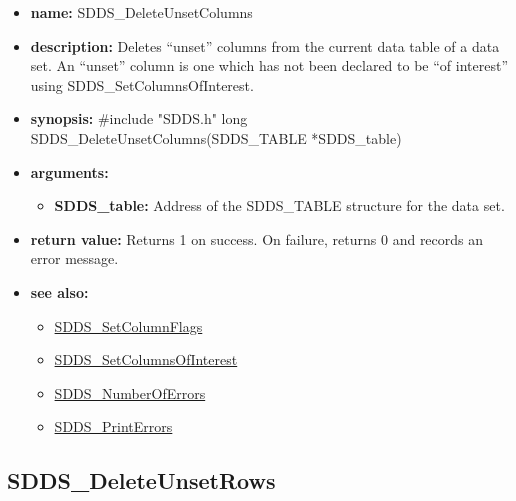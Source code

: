\documentclass[11pt]{article}
\newcommand{\progref}[1]{\hyperref{SDDS_#1}{{\tt SDDS\_#1} (}{)}{SDDS_#1}}
\begin{document}
\begin{itemize}
\item {\bf name:}\newline
SDDS\_DeleteUnsetColumns
\item {\bf description:}\newline
Deletes ``unset'' columns from the current data table of a data set. An ``unset'' column is one which has not been declared to be ``of interest'' using SDDS\_SetColumnsOfInterest.
\item {\bf synopsis:} \#include "SDDS.h"\newline
long SDDS\_DeleteUnsetColumns(SDDS\_TABLE *SDDS\_table)
\item {\bf arguments:}
\begin{itemize}
\item {\bf SDDS\_table:} Address of the SDDS\_TABLE structure for the data set.
\end{itemize}
\item {\bf return value:}\newline
Returns 1 on success. On failure, returns 0 and records an error message.
\item {\bf see also:}
\begin{itemize}
\item \progref{SetColumnFlags}
\item \progref{SetColumnsOfInterest}
\item \progref{NumberOfErrors}
\item \progref{PrintErrors}
\end{itemize}
\end{itemize}

\subsection{SDDS\_DeleteUnsetRows}
\label{SDDS_DeleteUnsetRows}
\end{document}
